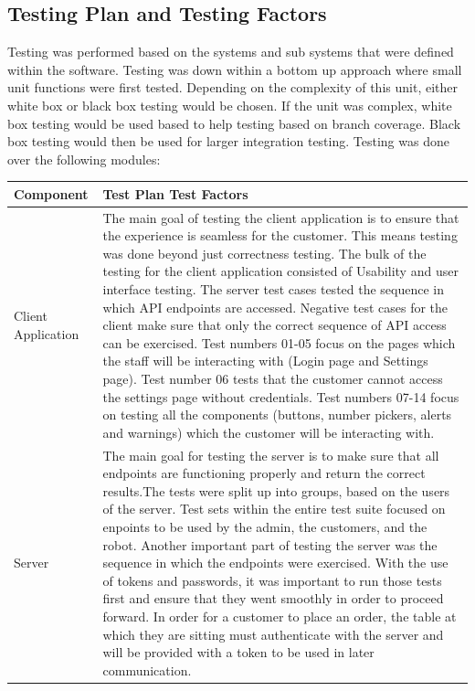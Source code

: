 \documentclass [10pt]{article}
\begin{document}
\subsection{Testing Plan and Testing Factors}
Testing was performed based on the systems and sub systems that were defined within the software. Testing was down within a bottom up approach where small unit functions were first tested. Depending on the complexity of this unit, either white box or black box testing would be chosen. If the unit was complex, white box testing would be used based to help testing based on branch coverage. Black box testing would then be used for larger integration testing. Testing was done over the following modules: \\

	\begin{longtable}{| p{} | p{} |}\hline 
				\rowcolor{tableCell}\textbf{Component} & \textbf{Test Plan Test Factors} \\ \hline
		Client Application & The main goal of testing the client application is to ensure that the experience is seamless for the customer. This means testing was done beyond just correctness testing. The bulk of the testing for the client application consisted of Usability and user interface testing. The server test cases tested the sequence in which API endpoints are accessed. Negative test cases for the client make sure that only the correct sequence of API access can be exercised.  Test numbers 01-05 focus on the pages which the staff will be interacting with (Login page and Settings page). Test number 06 tests that the customer cannot access the settings page without credentials. Test numbers 07-14 focus on testing all the components (buttons, number pickers, alerts and warnings) which the customer will be interacting with. \\ \hline
		Server & The main goal for testing the server is to make sure that all endpoints are functioning properly and return the correct results.The tests were split up into groups, based on the users of the server. Test sets within the entire test suite focused on enpoints to be used by the admin, the customers, and the robot. Another important part of testing the server was the sequence in which the endpoints were exercised. With the use of tokens and passwords, it was important to run those tests first and ensure that they went smoothly in order to proceed forward. In order for a customer to place an order, the table at which they are sitting must authenticate with the server and will be provided with a token to be used in later communication. \\ \hline

\end{longtable}
\end{document}
